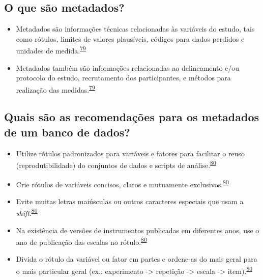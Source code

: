 \documentclass[
  a4paper,
]{book}
\begin{document}
\hypertarget{o-que-suxe3o-metadados}{%
\subsection{O que são metadados?}\label{o-que-suxe3o-metadados}}

\begin{itemize}
\item
  Metadados são informações técnicas relacionadas às variáveis do estudo, tais como rótulos, limites de valores plausíveis, códigos para dados perdidos e unidades de medida.\textsuperscript{\protect\hyperlink{ref-Baillie2022}{79}}
\item
  Metadados também são informações relacionadas ao delineamento e/ou protocolo do estudo, recrutamento dos participantes, e métodos para realização das medidas.\textsuperscript{\protect\hyperlink{ref-Baillie2022}{79}}
\end{itemize}

\hypertarget{quais-suxe3o-as-recomendauxe7uxf5es-para-os-metadados-de-um-banco-de-dados}{%
\subsection{Quais são as recomendações para os metadados de um banco de dados?}\label{quais-suxe3o-as-recomendauxe7uxf5es-para-os-metadados-de-um-banco-de-dados}}

\begin{itemize}
\item
  Utilize rótulos padronizados para variáveis e fatores para facilitar o reuso (reprodutibilidade) do conjuntos de dados e scripts de análise.\textsuperscript{\protect\hyperlink{ref-buttliere2021}{80}}
\item
  Crie rótulos de variáveis concisos, claros e mutuamente exclusivos.\textsuperscript{\protect\hyperlink{ref-buttliere2021}{80}}
\item
  Evite muitas letras maiúsculas ou outros caracteres especiais que usam a \emph{shift}.\textsuperscript{\protect\hyperlink{ref-buttliere2021}{80}}
\item
  Na existência de versões de instrumentos publicadas em diferentes anos, use o ano de publicação das escalas no rótulo.\textsuperscript{\protect\hyperlink{ref-buttliere2021}{80}}
\item
  Divida o rótulo da variável ou fator em partes e ordene-as do mais geral para o mais particular geral (ex.: experimento -\textgreater{} repetição -\textgreater{} escala -\textgreater{} item).\textsuperscript{\protect\hyperlink{ref-buttliere2021}{80}}
\end{itemize}
\end{document}
